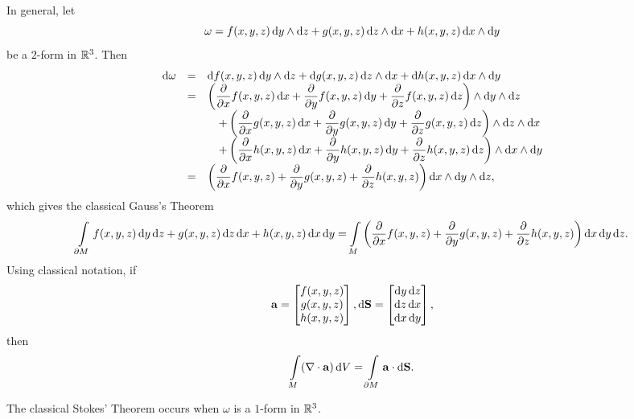 In general, let $$ \omega = f(x,y,z)\d{y} \wedge \d{z} +
g(x,y,z)\d{z} \wedge \d{x} + h(x,y,z) \d{x}  \wedge \d{y}
$$ be a $2$-form in $\mathbb{R} ^3$.
Then
 $$\begin{array}{lll} \d{\omega}  & =  & \d{f(x,y,z)}\d{y} \wedge \d{z} + \d{g(x,y,z)}\d{z}
\wedge \d{x} + \d{h(x,y,z)} \d{x}  \wedge \d{y} \\
 &=& \left(\dfrac{\partial }{\partial x}f(x,y,z)\d{x}+ \dfrac{\partial }{\partial y}f(x,y,z)\d{y}+ \dfrac{\partial }{\partial z}f(x,y,z)\d{z}\right)\wedge \d{y}\wedge\d{z}
\\ & & \quad  +  \left(\dfrac{\partial }{\partial x}g(x,y,z)\d{x}+ \dfrac{\partial
}{\partial
 y}g(x,y,z)\d{y}+ \dfrac{\partial
}{\partial
 z}g(x,y,z)\d{z}\right)\wedge \d{z}\wedge\d{x}\\
 & & \quad  +  \left(\dfrac{\partial }{\partial x}h(x,y,z)\d{x}+ \dfrac{\partial
}{\partial
 y}h(x,y,z)\d{y}+ \dfrac{\partial
}{\partial
 z}h(x,y,z)\d{z}\right)\wedge \d{x}\wedge\d{y}\\
 & = &  \left(\dfrac{\partial }{\partial x}f(x,y,z)+ \dfrac{\partial }{\partial
 y}g(x,y,z) +\dfrac{\partial }{\partial
 z}h(x,y,z)  \right)\d{x}\wedge\d{y} \wedge \d{z},
 \end{array}$$
which gives the classical Gauss's Theorem
$$  \dint \limits _{\partial M}  f(x,y,z)\d{y}  \d{z} + g(x,y,z)\d{z}
\d{x} + h(x,y,z) \d{x}  \d{y} = \dint \limits _M
\left(\dfrac{\partial }{\partial x}f(x,y,z)+\dfrac{\partial
}{\partial y}g(x,y,z)+\dfrac{\partial }{\partial
z}h(x,y,z)\right)\d{x}\d{y}\d{z}.$$ Using classical notation, if
$$\vector{a}=\colvec{f(x,y,z)\\ g(x,y,z)\\ h(x,y,z)}, \d{\vector{S}} = \colvec{\d{y}\d{z}\\ \d{z}\d{x}\\ \d{x}\d{y}}, $$
then
$$\dint  \limits _{ M}  (\nabla \cdot \vector{a} )\d{V} = \dint \limits _{\partial M} \vector{a} \cdot \d{\vector{S}}.  $$




\bigskip


The classical Stokes' Theorem occurs when $\omega$ is a $1$-form in
$\mathbb{R}^3$.

